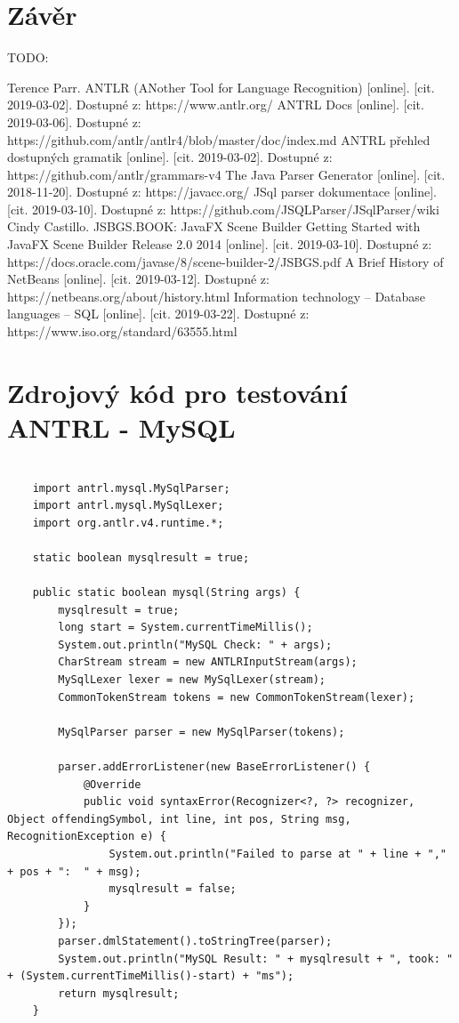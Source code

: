\documentclass[czech,bachelor,public,dept460,male,cpdeclaration,twoside]{diploma}
\begin{document}
\section{Závěr}
TODO:


\begin{thebibliography}{99}
	 Terence Parr. ANTLR (ANother Tool for Language Recognition) [online]. [cit. 2019-03-02]. Dostupné z: https://www.antlr.org/
	 ANTRL Docs [online]. [cit. 2019-03-06]. Dostupné z: https://github.com/antlr/antlr4/blob/master/doc/index.md
	 ANTRL přehled dostupných gramatik [online]. [cit. 2019-03-02]. Dostupné z: https://github.com/antlr/grammars-v4
	 The Java Parser Generator [online]. [cit. 2018-11-20]. Dostupné z: https://javacc.org/
	 JSql parser dokumentace [online]. [cit. 2019-03-10]. Dostupné z: https://github.com/JSQLParser/JSqlParser/wiki
	 Cindy Castillo. JSBGS.BOOK: JavaFX Scene Builder Getting Started with JavaFX Scene Builder Release 2.0 2014 [online]. [cit. 2019-03-10]. Dostupné z: https://docs.oracle.com/javase/8/scene-builder-2/JSBGS.pdf
	 A Brief History of NetBeans [online]. [cit. 2019-03-12]. Dostupné z: https://netbeans.org/about/history.html
	 Information technology -- Database languages -- SQL [online]. [cit. 2019-03-22]. Dostupné z: https://www.iso.org/standard/63555.html
	
	
	
	
	
\end{thebibliography}


\appendix %
\section{Zdrojový kód pro testování ANTRL - MySQL}
\begin{lstlisting}[caption=ANTRL MySQL]

	import antrl.mysql.MySqlParser;
	import antrl.mysql.MySqlLexer;
	import org.antlr.v4.runtime.*;

    static boolean mysqlresult = true;

    public static boolean mysql(String args) {
        mysqlresult = true;
        long start = System.currentTimeMillis();
        System.out.println("MySQL Check: " + args);
        CharStream stream = new ANTLRInputStream(args);
        MySqlLexer lexer = new MySqlLexer(stream);
        CommonTokenStream tokens = new CommonTokenStream(lexer);

        MySqlParser parser = new MySqlParser(tokens);

        parser.addErrorListener(new BaseErrorListener() {
            @Override
            public void syntaxError(Recognizer<?, ?> recognizer, Object offendingSymbol, int line, int pos, String msg, RecognitionException e) {
                System.out.println("Failed to parse at " + line + "," + pos + ":  " + msg);
                mysqlresult = false;
            }
        });
        parser.dmlStatement().toStringTree(parser);
        System.out.println("MySQL Result: " + mysqlresult + ", took: " + (System.currentTimeMillis()-start) + "ms");
        return mysqlresult;
    }
\end{lstlisting}
\end{document}
